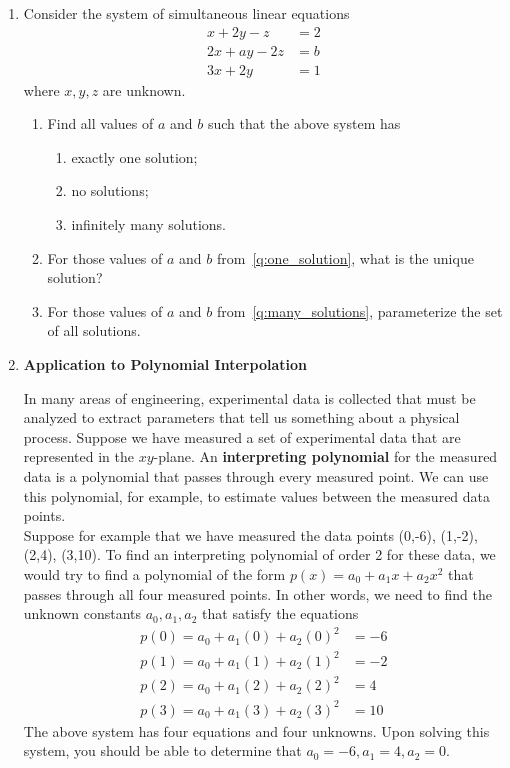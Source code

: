 \documentclass{article}
\begin{document}
\begin{enumerate}
\item 

Consider the system of simultaneous linear equations
\begin{align*}
  x + 2y -  z &= 2 \\
 2x + ay - 2z &= b \\
 3x + 2y      &= 1
\end{align*}
where $x, y, z$ are unknown.

\begin{enumerate}
\item Find all values of $a$ and $b$ such that the above system has
\begin{enumerate}
\item \label{q:one_solution} exactly one solution;
\item no solutions;
\item \label{q:many_solutions} infinitely many solutions.
\end{enumerate}
\item For those values of $a$ and $b$ from~\ref{q:one_solution}, what is the
unique solution?
\item For those values of $a$ and $b$ from~\ref{q:many_solutions},
 parameterize the set of all solutions.
\end{enumerate}

\item \textbf{Application to Polynomial Interpolation}

In many areas of engineering, experimental data is collected that must be analyzed to extract parameters that tell us something about a physical process. Suppose we have measured a set of experimental data that are represented in the $xy$-plane. An \textbf{interpreting polynomial} for the measured data is a polynomial that passes through every measured point. We can use this polynomial, for example, to estimate values between the measured data points. \\

Suppose for example that we have measured the data points (0,-6), (1,-2), (2,4), (3,10). To find an interpreting polynomial of order 2 for these data, we would try to find a polynomial of the form $p(x) = a_0+a_1x+a_2x^2$ that passes through all four measured points. In other words, we need to find the unknown constants $a_0, a_1, a_2$ that satisfy the equations
\begin{align*}
p(0) = a_0+a_1(0)+a_2(0)^2 &= -6 \\
p(1) = a_0+a_1(1)+a_2(1)^2 &= -2 \\
p(2) = a_0+a_1(2)+a_2(2)^2 &= 4  \\
p(3) = a_0+a_1(3)+a_2(3)^2 &= 10 
\end{align*}
The above system has four equations and four unknowns. Upon solving this system, you should be able to determine that $a_0 = -6, a_1 = 4, a_2=0$.\\


\end{enumerate}
\end{document}

